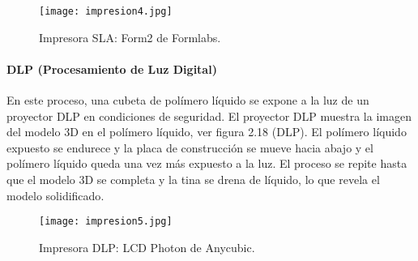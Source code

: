 \begin{figure}[H]
	\centering
	\texttt{[image: impresion4.jpg]}
	\caption{Impresora SLA: Form2 de Formlabs.}
\end{figure}

\paragraph{DLP (Procesamiento de Luz Digital)}
En este proceso, una cubeta de polímero líquido se expone a la luz de un proyector DLP en condiciones de seguridad. El proyector DLP muestra la imagen del modelo 3D en el polímero líquido, ver figura 2.18 (DLP). El polímero líquido expuesto se endurece y la placa de construcción se mueve hacia abajo y el polímero líquido queda una vez más expuesto a la luz. El proceso se repite hasta que el modelo 3D se completa y la tina se drena de líquido, lo que revela el modelo solidificado\cite{impresoras3d-blog}.

\begin{figure}[H]
	\centering
	\texttt{[image: impresion5.jpg]}
	\caption{Impresora DLP: LCD Photon de Anycubic.}
\end{figure}

